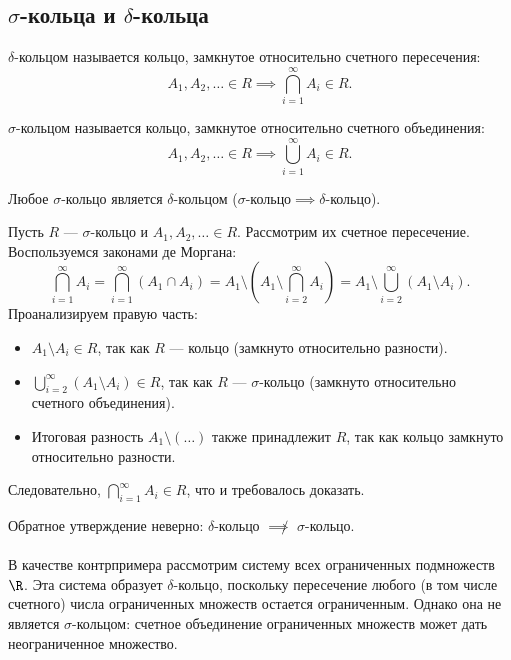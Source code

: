 \subsection{$\sigma$-кольца и $\delta$-кольца}

\begin{definition}
    $\delta$-кольцом называется кольцо, замкнутое относительно счетного пересечения:
    \[
        A_1, A_2, \dots \in R \implies \bigcap_{i=1}^{\infty} A_i \in R.
    \] %
\end{definition}

\begin{definition}
    $\sigma$-кольцом называется кольцо, замкнутое относительно счетного объединения:
    \[
        A_1, A_2, \dots \in R \implies \bigcup_{i=1}^{\infty} A_i \in R.
    \] %
\end{definition}

\begin{exercise}
    Любое $\sigma$-кольцо является $\delta$-кольцом ($\sigma\text{-кольцо} \implies \delta\text{-кольцо}$). %
\end{exercise}

\begin{Proof}
    Пусть $R$ --- $\sigma$-кольцо и $A_1, A_2, \dots \in R$. Рассмотрим их счетное пересечение. Воспользуемся законами де Моргана: %
    \[
        \bigcap_{i=1}^{\infty} A_i = \bigcap_{i=1}^{\infty} (A_1 \cap A_i) = A_1 \setminus \left( A_1 \setminus \bigcap_{i=2}^{\infty} A_i \right) = A_1 \setminus \bigcup_{i=2}^{\infty} (A_1 \setminus A_i).
    \]
    Проанализируем правую часть: %
    \begin{itemize}
        \item $A_1 \setminus A_i \in R$, так как $R$ --- кольцо (замкнуто относительно разности).
        \item $\bigcup_{i=2}^{\infty} (A_1 \setminus A_i) \in R$, так как $R$ --- $\sigma$-кольцо (замкнуто относительно счетного объединения).
        \item Итоговая разность $A_1 \setminus \left( \dots \right)$ также принадлежит $R$, так как кольцо замкнуто относительно разности.
    \end{itemize}
    Следовательно, $\bigcap_{i=1}^{\infty} A_i \in R$, что и требовалось доказать. %
\end{Proof}

\begin{example}
    Обратное утверждение неверно: $\delta$-кольцо $\not\implies$ $\sigma$-кольцо. %
    \\
    \\
    В качестве контрпримера рассмотрим систему всех ограниченных подмножеств $\R$. %
    Эта система образует $\delta$-кольцо, поскольку пересечение любого (в том числе счетного) числа ограниченных множеств остается ограниченным. Однако она не является $\sigma$-кольцом: счетное объединение ограниченных множеств может дать неограниченное множество. 
\end{example}

